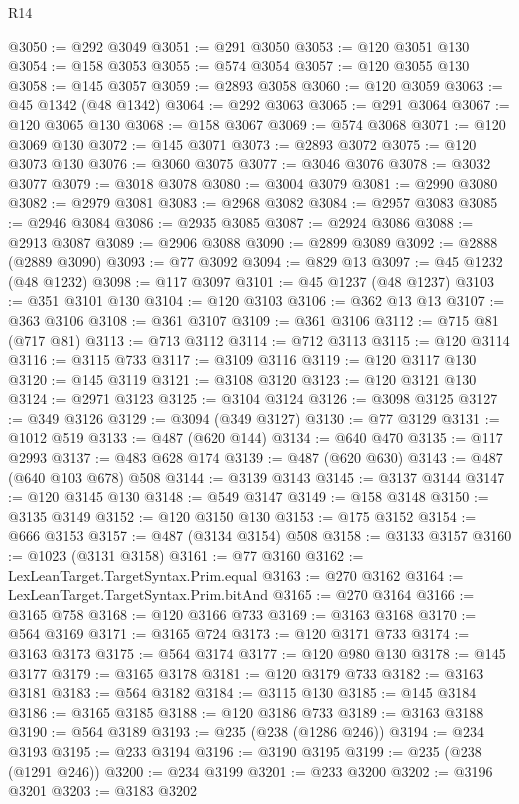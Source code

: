 \begin{lexlean}{R14}
\begin{coremodule}
@3050 := @292 @3049
@3051 := @291 @3050
@3053 := @120 @3051 @130
@3054 := @158 @3053
@3055 := @574 @3054
@3057 := @120 @3055 @130
@3058 := @145 @3057
@3059 := @2893 @3058
@3060 := @120 @3059
@3063 := @45 @1342 (@48 @1342)
@3064 := @292 @3063
@3065 := @291 @3064
@3067 := @120 @3065 @130
@3068 := @158 @3067
@3069 := @574 @3068
@3071 := @120 @3069 @130
@3072 := @145 @3071
@3073 := @2893 @3072
@3075 := @120 @3073 @130
@3076 := @3060 @3075
@3077 := @3046 @3076
@3078 := @3032 @3077
@3079 := @3018 @3078
@3080 := @3004 @3079
@3081 := @2990 @3080
@3082 := @2979 @3081
@3083 := @2968 @3082
@3084 := @2957 @3083
@3085 := @2946 @3084
@3086 := @2935 @3085
@3087 := @2924 @3086
@3088 := @2913 @3087
@3089 := @2906 @3088
@3090 := @2899 @3089
@3092 := @2888 (@2889 @3090)
@3093 := @77 @3092
@3094 := @829 @13
@3097 := @45 @1232 (@48 @1232)
@3098 := @117 @3097
@3101 := @45 @1237 (@48 @1237)
@3103 := @351 @3101 @130
@3104 := @120 @3103
@3106 := @362 @13 @13
@3107 := @363 @3106
@3108 := @361 @3107
@3109 := @361 @3106
@3112 := @715 @81 (@717 @81)
@3113 := @713 @3112
@3114 := @712 @3113
@3115 := @120 @3114
@3116 := @3115 @733
@3117 := @3109 @3116
@3119 := @120 @3117 @130
@3120 := @145 @3119
@3121 := @3108 @3120
@3123 := @120 @3121 @130
@3124 := @2971 @3123
@3125 := @3104 @3124
@3126 := @3098 @3125
@3127 := @349 @3126
@3129 := @3094 (@349 @3127)
@3130 := @77 @3129
@3131 := @1012 @519
@3133 := @487 (@620 @144)
@3134 := @640 @470
@3135 := @117 @2993
@3137 := @483 @628 @174
@3139 := @487 (@620 @630)
@3143 := @487 (@640 @103 @678) @508
@3144 := @3139 @3143
@3145 := @3137 @3144
@3147 := @120 @3145 @130
@3148 := @549 @3147
@3149 := @158 @3148
@3150 := @3135 @3149
@3152 := @120 @3150 @130
@3153 := @175 @3152
@3154 := @666 @3153
@3157 := @487 (@3134 @3154) @508
@3158 := @3133 @3157
@3160 := @1023 (@3131 @3158)
@3161 := @77 @3160
@3162 := LexLeanTarget.TargetSyntax.Prim.equal
@3163 := @270 @3162
@3164 := LexLeanTarget.TargetSyntax.Prim.bitAnd
@3165 := @270 @3164
@3166 := @3165 @758
@3168 := @120 @3166 @733
@3169 := @3163 @3168
@3170 := @564 @3169
@3171 := @3165 @724
@3173 := @120 @3171 @733
@3174 := @3163 @3173
@3175 := @564 @3174
@3177 := @120 @980 @130
@3178 := @145 @3177
@3179 := @3165 @3178
@3181 := @120 @3179 @733
@3182 := @3163 @3181
@3183 := @564 @3182
@3184 := @3115 @130
@3185 := @145 @3184
@3186 := @3165 @3185
@3188 := @120 @3186 @733
@3189 := @3163 @3188
@3190 := @564 @3189
@3193 := @235 (@238 (@1286 @246))
@3194 := @234 @3193
@3195 := @233 @3194
@3196 := @3190 @3195
@3199 := @235 (@238 (@1291 @246))
@3200 := @234 @3199
@3201 := @233 @3200
@3202 := @3196 @3201
@3203 := @3183 @3202

\end{coremodule}
\end{lexlean}
